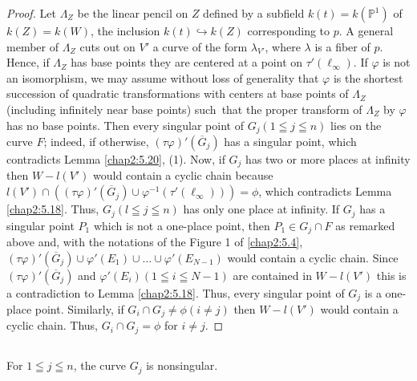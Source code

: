 \begin{proof}
Let $\Lambda_{Z}$ be the linear pencil on $Z$ defined by a subfield
$k(t)=k(\mathbb{P}^{1})$ of $k(Z)=k(W)$, the inclusion
$k(t)\hookrightarrow k(Z)$ corresponding to $p$. A general member of
$\Lambda_{Z}$ cuts out on $V'$ a curve of the form $\lambda_{V'}$,
where $\lambda$ is a fiber of $p$. Hence, if $\Lambda_{Z}$ has base
points they are centered at a point on $\tau'(\ell_{\infty})$. If
$\varphi$ is not an isomorphism, we may assume without loss of
generality that $\varphi$ is the shortest succession of quadratic
transformations with centers at base points of $\Lambda_{Z}$
(including infinitely near base points) such\pageoriginale\ that the
proper transform of $\Lambda_{Z}$ by $\varphi$ has no base
points. Then every singular point of $G_{j}(1\leqq j\leqq n)$ lies on
the curve $F$; indeed, if otherwise,
$(\tau\varphi)'(\overline{G}_{j})$ has a singular point, which
contradicts Lemma \ref{chap2:5.20}, (1). Now, if $G_{j}$ has two or more
places at infinity then $W-l(V')$ would contain a cyclic chain because
$l(V')\cap
((\tau\varphi)'(\overline{G}_{j})\cup\varphi^{-1}(\tau'(\ell_{\infty})))=\phi$,
which contradicts Lemma \ref{chap2:5.18}. Thus, $G_{j}(l\leqq j\leqq n)$
has only one place at infinity. If $G_{j}$ has a singular point
$P_{1}$ which is not a one-place point, then $P_{1}\in G_{j}\cap F$ as
remarked above and, with the notations of the Figure 1 of \ref{chap2:5.4},
$(\tau\varphi)'(\overline{G}_{j})\cup
\varphi'(E_{1})\cup\ldots\cup\varphi'(E_{N-1})$ would contain a cyclic
chain. Since $(\tau\varphi)'(\overline{G}_{j})$ and
$\varphi'(E_{i})(1\leqq i\leqq N-1)$ are contained in $W-l(V')$ this
is a contradiction to Lemma \ref{chap2:5.18}. Thus, every singular point
of $G_{j}$ is a one-place point. Similarly, if $G_{i}\cap
G_{j}\neq\phi(i\neq j)$ then $W-l(V')$ would contain a cyclic
chain. Thus, $G_{i}\cap G_{j}=\phi$ for $i\neq j$. 
\end{proof}

\subsection{}\label{chap2:5.22}
\begin{lemma*}
  For $1\leqq j\leqq n$, the curve $G_{j}$ is nonsingular.
\end{lemma*}

